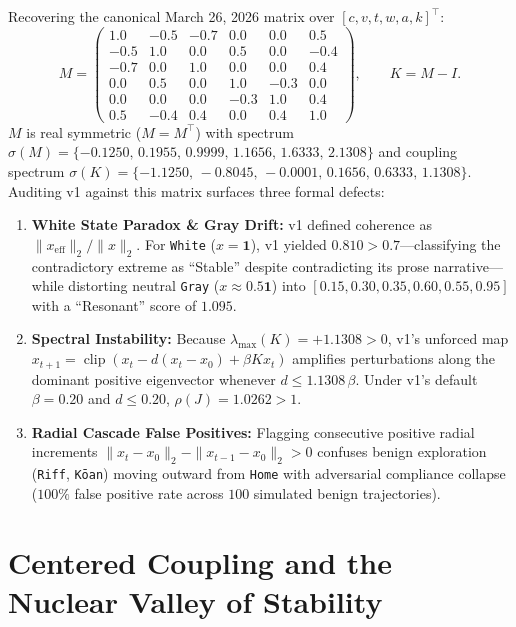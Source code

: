 \documentclass[11pt,letterpaper]{article}
\begin{document}
Recovering the canonical March 26, 2026 matrix over $[c, v, t, w, a, k]^\top$:
\begin{equation}
  M = \begin{pmatrix}
    1.0 & -0.5 & -0.7 &  0.0 &  0.0 &  0.5 \\
   -0.5 &  1.0 &  0.0 &  0.5 &  0.0 & -0.4 \\
   -0.7 &  0.0 &  1.0 &  0.0 &  0.0 &  0.4 \\
    0.0 &  0.5 &  0.0 &  1.0 & -0.3 &  0.0 \\
    0.0 &  0.0 &  0.0 & -0.3 &  1.0 &  0.4 \\
    0.5 & -0.4 &  0.4 &  0.0 &  0.4 &  1.0
  \end{pmatrix}, \qquad K = M - I.
\end{equation}
$M$ is real symmetric ($M = M^\top$) with spectrum $\sigma(M) = \{-0.1250,\, 0.1955,\, 0.9999,\, 1.1656,\, 1.6333,\, 2.1308\}$ and coupling spectrum $\sigma(K) = \{-1.1250,\, -0.8045,\, -0.0001,\, 0.1656,\, 0.6333,\, 1.1308\}$. Auditing v1 against this matrix surfaces three formal defects:
\begin{enumerate}
  \item \textbf{White State Paradox \& Gray Drift:} v1 defined coherence as $\|x_{\mathrm{eff}}\|_2 / \|x\|_2$. For \texttt{White} ($x=\mathbf{1}$), v1 yielded $0.810 > 0.7$---classifying the contradictory extreme as ``Stable'' despite contradicting its prose narrative---while distorting neutral \texttt{Gray} ($x \approx 0.5\mathbf{1}$) into $[0.15, 0.30, 0.35, 0.60, 0.55, 0.95]$ with a ``Resonant'' score of $1.095$.
  \item \textbf{Spectral Instability:} Because $\lambda_{\max}(K) = +1.1308 > 0$, v1's unforced map $x_{t+1} = \operatorname{clip}(x_t - d(x_t - x_0) + \beta K x_t)$ amplifies perturbations along the dominant positive eigenvector whenever $d \le 1.1308\,\beta$. Under v1's default $\beta = 0.20$ and $d \le 0.20$, $\rho(J) = 1.0262 > 1$.
  \item \textbf{Radial Cascade False Positives:} Flagging consecutive positive radial increments $\|x_t - x_0\|_2 - \|x_{t-1} - x_0\|_2 > 0$ confuses benign exploration (\texttt{Riff}, \texttt{Kōan}) moving outward from \texttt{Home} with adversarial compliance collapse ($100\%$ false positive rate across $100$ simulated benign trajectories).
\end{enumerate}

\section{Centered Coupling and the Nuclear Valley of Stability}
\end{document}
